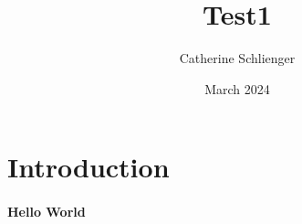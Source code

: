 \documentclass{article}
\title{Test1}
\author{Catherine Schlienger}
\date{March 2024}
\begin{document}
\maketitle

\section{Introduction}
\paragraph{Hello World}
\end{document}
